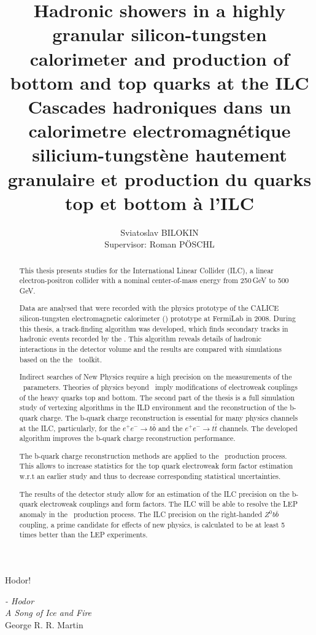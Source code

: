 \documentclass[a4paper, 12pt]{article}
\title{Hadronic showers in a highly granular silicon-tungsten calorimeter and production of bottom and top quarks at the ILC \\ Cascades hadroniques dans un calorimetre electromagn\'etique silicium-tungst\`ene hautement granulaire et production du quarks top et bottom \`a l'ILC}
\author{Sviatoslav BILOKIN\\Supervisor:  Roman P\"OSCHL}
\begin{document}
	
	\epigraph{Hodor!}{\textit{ - Hodor \\ A Song of Ice and Fire} \\George R. R. Martin}	\newpage
%

\renewcommand{\abstractname}{Abstact}
\begin{abstract}

This thesis presents studies for the International Linear Collider (ILC), a linear electron-positron collider with a nominal center-of-mass energy from 250\,GeV to 500\,GeV.

Data are analysed that were recorded with the physics prototype of the CALICE silicon-tungsten electromagnetic calorimeter (\ecal) prototype at FermiLab in 2008. During this thesis, a track-finding algorithm was developed, which finds secondary tracks in hadronic events recorded by the \ecalp. This algorithm reveals details of hadronic interactions in the detector volume and the results are compared with simulations based on the the \geant\ toolkit.

Indirect searches of New Physics require a high precision on the measurements of the \sm\ parameters. Theories of physics beyond \sm\ imply modifications of electroweak couplings of the heavy quarks top and bottom. The second part of the thesis is a full simulation study of vertexing algorithms in the ILD environment and the reconstruction of the b-quark charge. The b-quark charge reconstruction is essential for many physics channels at the ILC, particularly, for the $e^+e^-\to b\bar{b}$ and the $e^+e^-\to t\bar{t}$ channels.
The developed algorithm improves the b-quark charge reconstruction performance.

The b-quark charge reconstruction methods are applied to the \ttbar\ production process. This allows to increase statistics for the top quark electroweak form factor estimation w.r.t an earlier study and thus to decrease corresponding statistical uncertainties.

The results of the detector study allow for an estimation of the ILC precision on the b-quark electroweak couplings and form factors. The ILC will be able to resolve the LEP anomaly in the \bbbar\ production process. The ILC precision on the right-handed $Z^0b\bar{b}$ coupling, a prime candidate for effects of new physics, is calculated to be at least 5 times better than the LEP experiments. 
\end{abstract}
\end{document}
